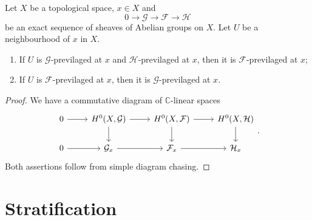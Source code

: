 \begin{proposition}\label{prop-previalsequence}
    Let $X$ be a topological space, $x\in X$ and 
    \[
        0\rightarrow \mathcal{G}\rightarrow \mathcal{F}\rightarrow \mathcal{H}
    \]
    be an exact sequence of sheaves of Abelian groups on $X$. Let $U$ be a neighbourhood of $x$ in $X$.
    \begin{enumerate}
        \item If $U$ is $\mathcal{G}$-previlaged at $x$ and $\mathcal{H}$-previlaged at $x$, then it is $\mathcal{F}$-previlaged at $x$;
        \item If $U$ is $\mathcal{F}$-previlaged at $x$, then it is $\mathcal{G}$-previlaged at $x$.
    \end{enumerate}
\end{proposition}
\begin{proof}
    We have a commutative diagram of $\mathbb{C}$-linear spaces
    \[
        \begin{tikzcd}
            0 \arrow[r] & {H^0(X,\mathcal{G})} \arrow[r] \arrow[d] & {H^0(X,\mathcal{F})} \arrow[r] \arrow[d] & {H^0(X,\mathcal{H})} \arrow[d] \\
            0 \arrow[r] & \mathcal{G}_x \arrow[r]                  & \mathcal{F}_x \arrow[r]                  & \mathcal{H}_x                 
        \end{tikzcd}.
    \]
    Both assertions follow from simple diagram chasing.
\end{proof}
\section{Stratification}



